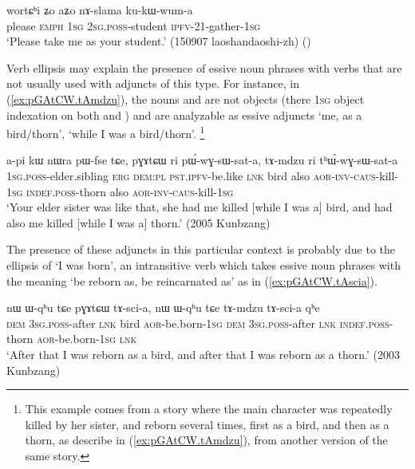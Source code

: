 \begin{exe}
\ex \label{ex:naslama.kukWwuma}
 \gll wortɕʰi ʑo aʑo nɤ-slama ku-kɯ-wum-a \\
please \textsc{emph} \textsc{1sg} \textsc{2sg}.\textsc{poss}-student \textsc{ipfv}-2\fl{}1-gather-\textsc{1sg} \\
\glt `Please take me as your student.' (150907 laoshandaoshi-zh)
()
\end{exe}

Verb ellipsis may explain the presence of essive noun phrases with verbs that are not usually used with adjuncts of this type. For instance, in (\ref{ex:pGAtCW.tAmdzu}), the nouns  and  are not objects (there \textsc{1sg} object indexation on both  and ) and are analyzable as essive adjuncts `me, as a bird/thorn', `while I was a bird/thorn'. \footnote{This example comes from a story where the main character was repeatedly killed by her sister, and reborn several times, first as a bird, and then as a thorn, as describe in (\ref{ex:pGAtCW.tAmdzu}), from another version of the same story. }  

\begin{exe}
\ex \label{ex:pGAtCW.tAmdzu}
\gll a-pi kɯ nɯra pɯ-fse tɕe, pɣɤtɕɯ ri pɯ́-wɣ-sɯ-sat-a,  tɤ-mdzu ri tʰɯ́-wɣ-sɯ-sat-a  \\
\textsc{1sg}.\textsc{poss}-elder.sibling \textsc{erg} \textsc{dem}:\textsc{pl} \textsc{pst}.\textsc{ipfv}-be.like \textsc{lnk} bird also \textsc{aor}-\textsc{inv}-\textsc{caus}-kill-\textsc{1sg} \textsc{indef}.\textsc{poss}-thorn also \textsc{aor}-\textsc{inv}-\textsc{caus}-kill-\textsc{1sg} \\
\glt `Your elder sister was like that, she had me killed [while I was a] bird, and had also me killed [while I was a] thorn.' (2005 Kunbzang)
\end{exe}
 
The presence of these adjuncts in this particular context is probably due to the ellipsis of  `I was born', an intransitive verb which takes essive noun phrases with the meaning `be reborn as, be reincarnated as' as in (\ref{ex:pGAtCW.tAscia}).
 
 \begin{exe}
\ex \label{ex:pGAtCW.tAscia}
\gll  nɯ ɯ-qʰu tɕe pɣɤtɕɯ tɤ-sci-a, nɯ ɯ-qʰu tɕe tɤ-mdzu tɤ-sci-a qʰe \\
\textsc{dem} \textsc{3sg}.\textsc{poss}-after \textsc{lnk} bird \textsc{aor}-be.born-\textsc{1sg} \textsc{dem} \textsc{3sg}.\textsc{poss}-after \textsc{lnk} \textsc{indef}.\textsc{poss}-thorn \textsc{aor}-be.born-\textsc{1sg}  \textsc{lnk} \\
 \glt `After that I was reborn as a bird, and after that I was reborn as a thorn.' (2003 Kunbzang)
 \end{exe}

